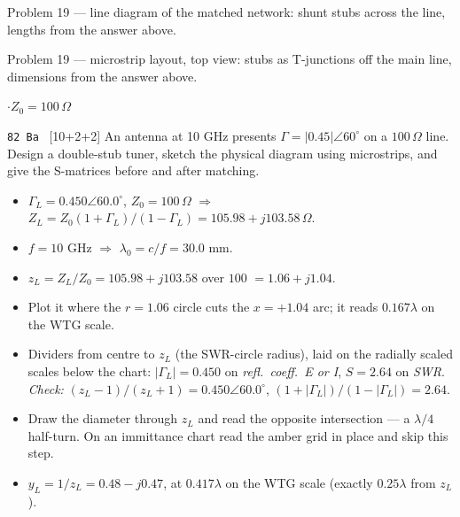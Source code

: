 {\footnotesize\color{sub} Problem 19 --- line diagram of the matched network: shunt stubs across the line, lengths from the answer above.}

{\footnotesize\color{sub} Problem 19 --- microstrip layout, top view: stubs as T-junctions off the main line, dimensions from the answer above.}

\vspace{2pt}

{\color{sub}\footnotesize {} \gap$\cdot$\gap $Z_0 = 100\,\Omega$}

\begin{asked}{\texttt{82 Ba} \ [10+2+2]}
An antenna at 10 GHz presents $\Gamma = |0.45|\angle 60^\circ$ on a $100\,\Omega$ line. Design a double-stub tuner, sketch the physical diagram using microstrips, and give the S-matrices before and after matching.
\end{asked}
\begin{itemize}
  \item $\Gamma_L = 0.450\angle 60.0^\circ$, $Z_0 = 100\,\Omega$ $\Rightarrow$ $Z_L = Z_0(1+\Gamma_L)/(1-\Gamma_L) = 105.98 + j103.58\,\Omega$.
  \item $f = 10\text{ GHz}$ $\Rightarrow$ $\lambda_0 = c/f = 30.0\text{ mm}$.
\end{itemize}
\begin{itemize}
  \item $z_L = Z_L/Z_0 = 105.98 + j103.58$ over $100$ $=1.06 + j1.04$.
  \item Plot it where the $r = 1.06$ circle cuts the $x = +1.04$ arc; it reads $0.167\lambda$ on the WTG scale.
  \item Dividers from centre to $z_L$ (the SWR-circle radius), laid on the radially scaled scales below the chart: $|\Gamma_L| = 0.450$ on \emph{refl.\ coeff.\ E or I}, $S = 2.64$ on \emph{SWR}. \textit{Check:} $(z_L-1)/(z_L+1) = 0.450\angle 60.0^\circ$, $(1+|\Gamma_L|)/(1-|\Gamma_L|) = 2.64$.
\end{itemize}
\begin{itemize}
  \item Draw the diameter through $z_L$ and read the opposite intersection --- a $\lambda/4$ half-turn. On an immittance chart read the amber grid in place and skip this step.
  \item $y_L = 1/z_L = 0.48 - j0.47$, at $0.417\lambda$ on the WTG scale (exactly $0.25\lambda$ from $z_L$).
\end{itemize}
